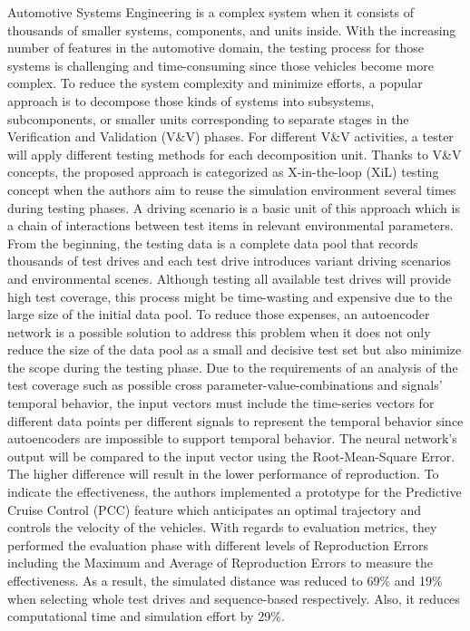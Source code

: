 \documentclass[10pt,a4paper]{report}
\begin{document}
Automotive Systems Engineering is a complex system when it consists of thousands of smaller systems, components, and units inside.
%
With the increasing number of features in the automotive domain, the testing process for those systems is challenging and time-consuming since those vehicles become more complex.
%
To reduce the system complexity and minimize efforts, a popular approach is to decompose those kinds of systems into subsystems, subcomponents, or smaller units corresponding to separate stages in the Veriﬁcation and Validation (V\&V) phases.
%
For different V\&V activities, a tester will apply different testing methods for each decomposition unit.
%
Thanks to V\&V concepts, the proposed approach is categorized as X-in-the-loop (XiL) testing concept when the authors aim to reuse the simulation environment several times during testing phases.
%
A driving scenario is a basic unit of this approach which is a chain of interactions between test items in relevant environmental parameters.
%
From the beginning, the testing data is a complete data pool that records thousands of test drives and each test drive introduces variant driving scenarios and environmental scenes.
%
Although testing all available test drives will provide high test coverage, this process might be time-wasting and expensive due to the large size of the initial data pool. 
%
To reduce those expenses, an autoencoder network is a possible solution to address this problem when it does not only reduce the size of the data pool as a small and decisive test set but also minimize the scope during the testing phase.
%
Due to the requirements of an analysis of the test coverage such as possible cross parameter-value-combinations and signals’ temporal behavior, the input vectors must include the time-series vectors for different data points per different signals to represent the temporal behavior since autoencoders are impossible to support temporal behavior.
%
The neural network's output will be compared to the input vector using the Root-Mean-Square Error.
%
The higher difference will result in the lower performance of reproduction.
%
To indicate the effectiveness, the authors implemented a prototype for the Predictive Cruise Control (PCC) feature which anticipates an optimal trajectory and controls the velocity of the vehicles.
%
With regards to evaluation metrics, they performed the evaluation phase with different levels of Reproduction Errors including the Maximum and Average of Reproduction Errors to measure the effectiveness.
%
As a result, the simulated distance was reduced to 69\% and 19\% when selecting whole test drives and sequence-based respectively. Also, it reduces computational time and simulation effort by 29\%.
\end{document}
